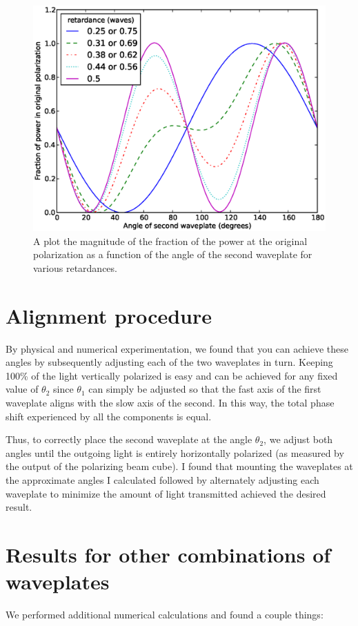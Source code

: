 \begin{figure}
    \centerline{\includegraphics{NewNotesSymmetricFig}}
    \caption[Transmitted power vs angle]{\label{fig:numericalLightControlMethod}
    A plot the magnitude of the fraction of the power at the original polarization as a function of the angle of the second waveplate for various retardances.}
\end{figure}


\section{Alignment procedure}
By physical and numerical experimentation, we found that you can achieve these angles by subsequently adjusting each of the two waveplates in turn. Keeping 100\% of the light vertically polarized is easy and can be achieved for any fixed value of $\theta_2$ since $\theta_1$ can simply be adjusted so that the fast axis of the first waveplate aligns with the slow axis of the second. In this way, the total phase shift experienced by all the components is equal.

Thus, to correctly place the second waveplate at the angle  $\theta_2$, we adjust both angles until the outgoing light is entirely horizontally polarized (as measured by the output of the polarizing beam cube). I found that mounting the waveplates at the approximate angles I calculated followed by alternately adjusting each waveplate to minimize the amount of light transmitted achieved the desired result. 

\section{Results for other combinations of waveplates}
We performed additional numerical calculations and found a couple things:

